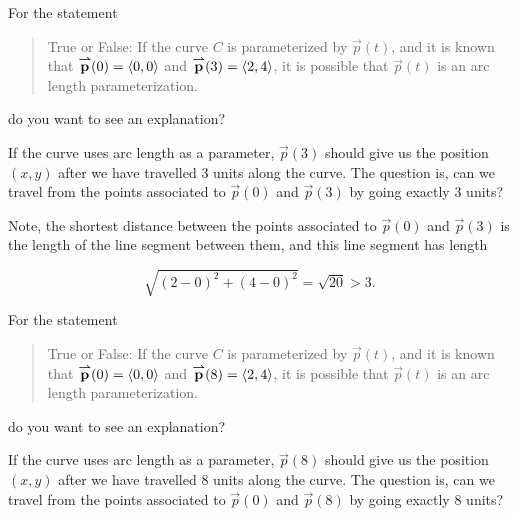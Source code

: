 \documentclass{ximera}
\begin{document}
\begin{exercise}
\begin{hint}
\begin{question}
For the statement

\begin{quote}
True or False: If the curve $C$ is parameterized by $\vec{p}(t)$, and it is known that ${\overset{\boldsymbol{\rightharpoonup}}{\mathbf{p}}}(0) = \left\langle 0,0\right\rangle$ and ${\overset{\boldsymbol{\rightharpoonup}}{\mathbf{p}}}(3) = \left\langle 2,4\right\rangle$, it is possible that $\vec{p}(t)$ is an arc length parameterization.
\end{quote}
do you want to see an explanation?

\begin{multipleChoice}
\end{multipleChoice}

\begin{feedback}[correct]
If the curve uses arc length as a parameter, $\vec{p}(3)$ should give us the position $(x,y)$ after we have travelled $3$ units along the curve.  The question is, can we travel from the points associated to $\vec{p}(0)$ and $\vec{p}(3)$ by going exactly $3$ units?

Note, the shortest distance between the points associated to $\vec{p}(0)$ and $\vec{p}(3)$ is the length of the line segment between them, and this line segment has length

\[
\sqrt{(2-0)^2+(4-0)^2} = \sqrt{20} >3.
\]

\end{feedback}
\end{question}



\begin{question}
For the statement

\begin{quote}
True or False: If the curve $C$ is parameterized by $\vec{p}(t)$, and it is known that ${\overset{\boldsymbol{\rightharpoonup}}{\mathbf{p}}}(0) = \left\langle 0,0\right\rangle$ and ${\overset{\boldsymbol{\rightharpoonup}}{\mathbf{p}}}(8) = \left\langle 2,4\right\rangle$, it is possible that $\vec{p}(t)$ is an arc length parameterization.
\end{quote}
do you want to see an explanation?

\begin{multipleChoice}
\end{multipleChoice}

\begin{feedback}[correct]
If the curve uses arc length as a parameter, $\vec{p}(8)$ should give us the position $(x,y)$ after we have travelled $8$ units along the curve.  The question is, can we travel from the points associated to $\vec{p}(0)$ and $\vec{p}(8)$ by going exactly $8$ units?


\end{feedback}
\end{question}
\end{hint}
\end{exercise}
\end{document}

